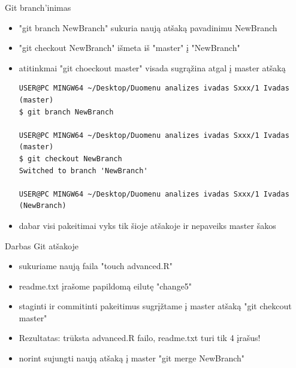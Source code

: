\documentclass[11pt,xcolor=table]{beamer}
\begin{document}
\begin{frame}[fragile]{Git branch'inimas}
\begin{itemize}
\item "git branch NewBranch" sukuria naują atšaką pavadinimu NewBranch
\item "git checkout NewBranch" išmeta iš "master" į "NewBranch"
\item atitinkmai "git choeckout master" visada sugrąžina atgal į master atšaką

\begin{lstlisting}
USER@PC MINGW64 ~/Desktop/Duomenu analizes ivadas Sxxx/1 Ivadas (master)
$ git branch NewBranch

USER@PC MINGW64 ~/Desktop/Duomenu analizes ivadas Sxxx/1 Ivadas (master)
$ git checkout NewBranch
Switched to branch 'NewBranch'

USER@PC MINGW64 ~/Desktop/Duomenu analizes ivadas Sxxx/1 Ivadas (NewBranch)

\end{lstlisting}

\item dabar visi pakeitimai vyks tik šioje atšakoje ir nepaveiks master šakos
\end{itemize}
\end{frame}

\begin{frame}{Darbas Git atšakoje}
\begin{itemize}
\item sukuriame naują faila "touch advanced.R"
\item readme.txt įrašome papildomą eilutę "change5"
\item staginti ir commitinti pakeitimus
sugrįžtame į master atšaką "git chekcout master"
\item Rezultatas: trūksta advanced.R failo, readme.txt turi tik 4 įrašus!
\item norint sujungti naują atšaką į master "git merge NewBranch"
\end{itemize}
\end{frame}
\end{document}
